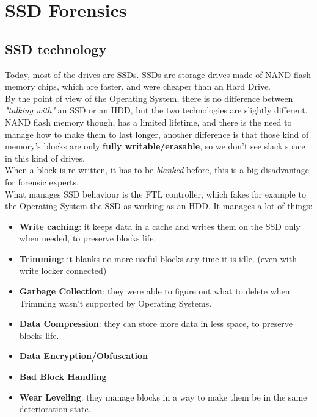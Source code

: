 \chapter{SSD Forensics}
    \section{SSD technology}
        Today, most of the drives are SSDs. SSDs are storage drives made of NAND flash memory chips, which are faster, and were cheaper than an Hard Drive.\\
        By the point of view of the Operating System, there is no difference between \textit{"talking with"} an SSD or an HDD, but the two technologies are slightly different.\\
        NAND flash memory though, has a limited lifetime, and there is the need to manage how to make them to last longer, another difference is that those kind of memory's blocks are only \textbf{fully writable/erasable}, so we don't see slack space in this kind of drives.\\
        When a block is re-written, it has to be \textit{blanked} before, this is a big disadvantage for forensic experts.\\
        What manages SSD behaviour is the FTL controller, which fakes for example to the Operating System the SSD as working as an HDD. It manages a lot of things:
        \begin{itemize}
            \item \textbf{Write caching}: it keeps data in a cache and writes them on the SSD only when needed, to preserve blocks life.
            \item \textbf{Trimming}: it blanks no more useful blocks any time it is idle. (even with write locker connected)
            \item \textbf{Garbage Collection}: they were able to figure out what to delete when Trimming wasn't supported by Operating Systems.
            \item \textbf{Data Compression}: they can store more data in less space, to preserve blocks life.
            \item \textbf{Data Encryption/Obfuscation}
            \item \textbf{Bad Block Handling}
            \item \textbf{Wear Leveling}: they manage blocks in a way to make them be in the same deterioration state.
        \end{itemize}